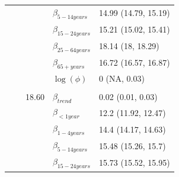 \documentclass[a4paper,twoside,11pt]{report} %
\theoremstyle{definition}
\theoremstyle{definition}
\theoremstyle{definition}
\theoremstyle{definition}
\theoremstyle{remark}
\begin{document}
\begin{longtable}[t]{llrll}
\hspace{1em}\hspace{1em} &  &  & $\beta_{5-14 years}$ & 14.99 (14.79, 15.19)\\

\hspace{1em}\hspace{1em} &  &  & $\beta_{15-24 years}$ & 15.21 (15.02, 15.41)\\

\hspace{1em}\hspace{1em} &  &  & $\beta_{25-64 years}$ & 18.14 (18, 18.29)\\

\hspace{1em}\hspace{1em} &  &  & $\beta_{65+ years}$ & 16.72 (16.57, 16.87)\\

\hspace{1em}\hspace{1em} &  &  & $\log(\phi)$ & 0 (NA, 0.03)\\
\cmidrule{2-5}
\addlinespace[0.3em]
\multicolumn{5}{l}{\begin{math}\log(\lambda_{it})=\beta(ageGroup_{i})+\beta_{trend} t +\log(n_{it})\end{math}}\\
\hspace{1em}\hspace{1em} &  & 18.60 & $\beta_{trend}$ & 0.02 (0.01, 0.03)\\

\hspace{1em}\hspace{1em} &  &  & $\beta_{<1 year}$ & 12.2 (11.92, 12.47)\\

\hspace{1em}\hspace{1em} &  &  & $\beta_{1-4 years}$ & 14.4 (14.17, 14.63)\\

\hspace{1em}\hspace{1em} &  &  & $\beta_{5-14 years}$ & 15.48 (15.26, 15.7)\\

\hspace{1em}\hspace{1em} &  &  & $\beta_{15-24 years}$ & 15.73 (15.52, 15.95)\\


\end{longtable}
\end{document}
